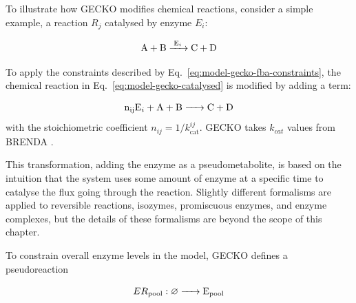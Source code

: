 
To illustrate how GECKO modifies chemical reactions, consider a simple example, a reaction $R_{j}$ catalysed by enzyme $E_{i}$:

\begin{equation}
  \ce{ A + B ->[E_{i}] C + D }
  \label{eq:model-gecko-catalysed}
\end{equation}

To apply the constraints described by Eq.\ \ref{eq:model-gecko-fba-constraints}, the chemical reaction in Eq.\ \ref{eq:model-gecko-catalysed} is modified by adding a term:

\begin{equation}
  \ce{ n_{ij}E_{i} + A + B -> C + D }
  \label{eq:model-gecko-catalysed-formalism}
\end{equation}
with the stoichiometric coefficient $n_{ij} = 1/k_{\mathrm{cat}}^{ij}$.
GECKO takes $k_{cat}$ values from BRENDA \parencite{changBRENDAELIXIRCore2021}.

This transformation, adding the enzyme as a pseudometabolite, is based on the intuition that the system uses some amount of enzyme at a specific time to catalyse the flux going through the reaction.
%
Slightly different formalisms are applied to reversible reactions, isozymes, promiscuous enzymes, and enzyme complexes, but the details of these formalisms are beyond the scope of this chapter.

To constrain overall enzyme levels in the model, GECKO defines a pseudoreaction

\begin{equation}
  ER_{\mathrm{pool}}: \varnothing \ce{ -> E_{pool} }
  \label{eq:model-gecko-enzyme-pool}
\end{equation}

